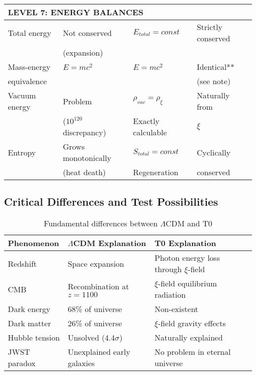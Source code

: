 \documentclass[12pt,a4paper]{article}
\begin{document}
\begin{longtable}{p{5cm}p{4cm}p{3.5cm}p{3.5cm}}
	\midrule
	\multicolumn{4}{l}{\textbf{LEVEL 7: ENERGY BALANCES}} \\
	\midrule
	
	Total energy & Not conserved & $E_{total} = const$ & Strictly conserved \\
	& (expansion) & & \\[0.3em]
	
	Mass-energy & $E = mc^2$ & $E = mc^2$ & Identical** \\
	equivalence & & & (see note) \\[0.3em]
	
	Vacuum energy & Problem & $\rho_{vac} = \rho_\xi$ & Naturally from \\
	& ($10^{120}$ discrepancy) & Exactly calculable & $\xi$ \\[0.3em]
	
	Entropy & Grows monotonically & $S_{total} = const$ & Cyclically \\
	& (heat death) & Regeneration & conserved \\[0.3em]
	
\end{longtable}

\subsection{Critical Differences and Test Possibilities}
\label{subsec:critical_differences}

\begin{table}[h]
	\centering
	\begin{tabular}{p{4cm}p{5cm}p{5cm}}
		\toprule
		\textbf{Phenomenon} & \textbf{$\Lambda$CDM Explanation} & \textbf{T0 Explanation} \\
		\midrule
		Redshift & Space expansion & Photon energy loss through $\xi$-field \\
		CMB & Recombination at $z=1100$ & $\xi$-field equilibrium radiation \\
		Dark energy & 68\% of universe & Non-existent \\
		Dark matter & 26\% of universe & $\xi$-field gravity effects \\
		Hubble tension & Unsolved (4.4$\sigma$) & Naturally explained \\
		JWST paradox & Unexplained early galaxies & No problem in eternal universe \\
		\bottomrule
	\end{tabular}
	\caption{Fundamental differences between $\Lambda$CDM and T0}
\end{table}
\end{document}

